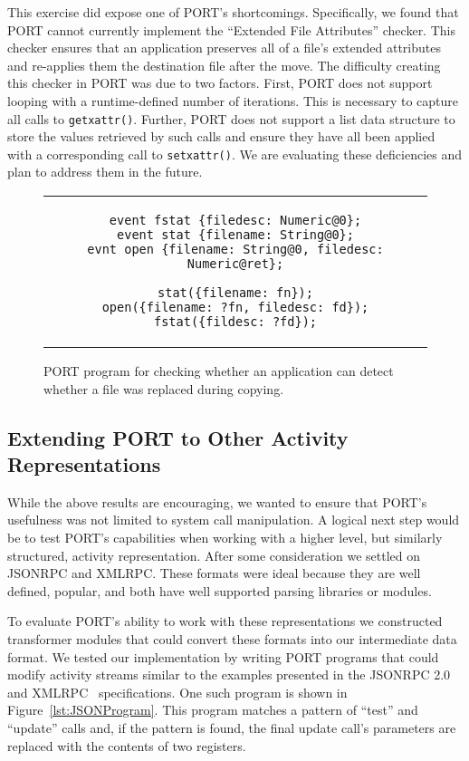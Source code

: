 This exercise did expose one of PORT's shortcomings.  Specifically,
we found that PORT cannot currently implement the ``Extended File
Attributes'' checker.
This checker ensures that an application
preserves all of a file's extended attributes and re-applies them the
destination file after the move.
The difficulty creating this checker
in PORT was due to two factors.
First, PORT does not support looping with a
runtime-defined number of iterations.  This is necessary to capture all
calls to {\tt getxattr()}.
Further, PORT does not support a list data structure to store the values
retrieved by such calls and ensure they have all been applied with a
corresponding call to {\tt setxattr()}.
We are evaluating these deficiencies and plan to address them in the
future.

\begin{figure}
\centering
\begin{tabular}{c}
\begin{lstlisting}
event fstat {filedesc: Numeric@0};
event stat {filename: String@0};
evnt open {filename: String@0, filedesc: Numeric@ret};

stat({filename: fn});
open({filename: ?fn, filedesc: fd});
fstat({fildesc: ?fd});
\end{lstlisting}
\end{tabular}
\caption{PORT program for checking whether an application can detect whether a file was replaced during copying.}
\label{lst:FileReplacedPORT}
\end{figure}

\subsection{Extending PORT to Other Activity Representations}

While the above results are encouraging, we wanted to ensure that PORT's
usefulness was not limited to system call manipulation.
A logical next step would be to test PORT's capabilities when working
with a higher level, but similarly structured, activity representation.
After some consideration we settled on JSONRPC and XMLRPC.  These formats
were ideal because they are well defined, popular, and both have well
supported parsing libraries or modules.

To evaluate PORT's ability to work with these representations we
constructed transformer modules that could convert these formats into our
intermediate data format.
We tested our implementation by writing PORT programs that could modify
activity streams similar to the examples presented in the JSONRPC
2.0~\cite{jsonspec} and XMLRPC~\cite{xmlspec}
specifications.  One such program is shown in
Figure~\ref{lst:JSONProgram}.  This program matches a pattern of ``test''
and ``update'' calls and, if the pattern is found, the final update call's
parameters are replaced with the contents of two registers.

